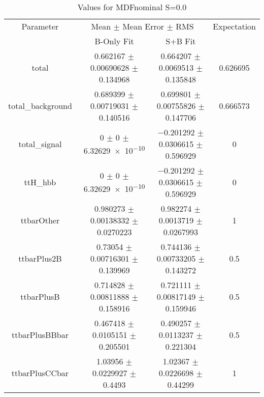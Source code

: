 \begin{table}
\centering
\caption{Values for MDFnominal S=0.0}
\begin{tabular}{cccc}
\toprule
Parameter & \multicolumn{2}{c}{Mean $\pm$ Mean Error $\pm$ RMS} & Expectation\\
 & B-Only Fit & S+B Fit & \\
\midrule
total & \num{0.662167} $\pm$ \num{0.00690628} $\pm$ \num{0.134968} & \num{0.664207} $\pm$ \num{0.0069513} $\pm$ \num{0.135848} & \num{0.626695}\\
total\_background & \num{0.689399} $\pm$ \num{0.00719031} $\pm$ \num{0.140516} & \num{0.699801} $\pm$ \num{0.00755826} $\pm$ \num{0.147706} & \num{0.666573}\\
total\_signal & \num{0} $\pm$ \num{0} $\pm$ \num{6.32629e-10} & \num{-0.201292} $\pm$ \num{0.0306615} $\pm$ \num{0.596929} & \num{0}\\
ttH\_hbb & \num{0} $\pm$ \num{0} $\pm$ \num{6.32629e-10} & \num{-0.201292} $\pm$ \num{0.0306615} $\pm$ \num{0.596929} & \num{0}\\
ttbarOther & \num{0.980273} $\pm$ \num{0.00138332} $\pm$ \num{0.0270223} & \num{0.982274} $\pm$ \num{0.0013719} $\pm$ \num{0.0267993} & \num{1}\\
ttbarPlus2B & \num{0.73054} $\pm$ \num{0.00716301} $\pm$ \num{0.139969} & \num{0.744136} $\pm$ \num{0.00733205} $\pm$ \num{0.143272} & \num{0.5}\\
ttbarPlusB & \num{0.714828} $\pm$ \num{0.00811888} $\pm$ \num{0.158916} & \num{0.721111} $\pm$ \num{0.00817149} $\pm$ \num{0.159946} & \num{0.5}\\
ttbarPlusBBbar & \num{0.467418} $\pm$ \num{0.0105151} $\pm$ \num{0.205501} & \num{0.490257} $\pm$ \num{0.0113237} $\pm$ \num{0.221304} & \num{0.5}\\
ttbarPlusCCbar & \num{1.03956} $\pm$ \num{0.0229927} $\pm$ \num{0.4493} & \num{1.02367} $\pm$ \num{0.0226698} $\pm$ \num{0.44299} & \num{1}\\
\bottomrule
\end{tabular}
\end{table}